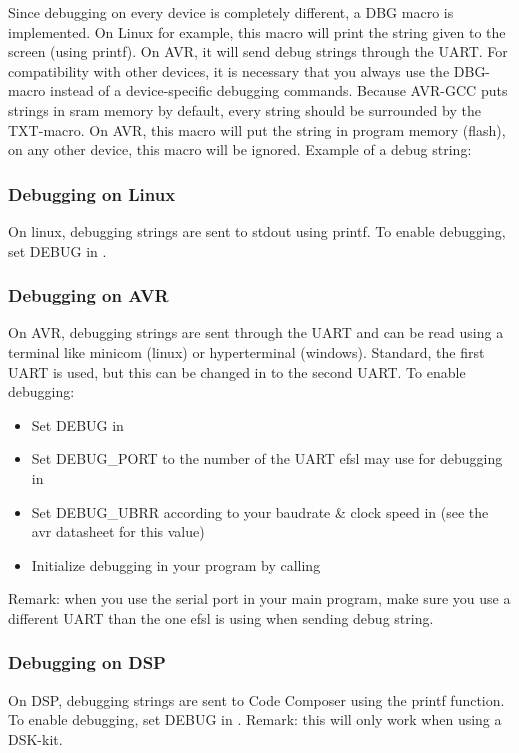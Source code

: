 Since debugging on every device is completely different, a DBG macro is 
implemented. On Linux for example, this macro will print the string given
to the screen (using printf). On AVR, it will send debug strings through the
UART. For compatibility with other devices, it is necessary that you always use
the DBG-macro instead of a device-specific debugging commands.\newline
\newline
Because AVR-GCC puts strings in sram memory by default, every string should be
surrounded by the TXT-macro. On AVR, this macro will put the string in program
memory (flash), on any other device, this macro will be ignored.\newline
\newline
Example of a debug string:\\ 

\subsubsection{Debugging on Linux}
On linux, debugging strings are sent to stdout using printf.\newline
\newline
To enable debugging, set DEBUG in .
\subsubsection{Debugging on AVR}
On AVR, debugging strings are sent through the UART and can be read using
a terminal like minicom (linux) or hyperterminal (windows). Standard, the
first UART is used, but this can be changed in  to the
second UART.\newline
\newline
To enable debugging:
\begin{itemize}
	\item{Set DEBUG in }
	\item{Set DEBUG\_PORT to the number of the UART efsl may use for debugging 
		in }
	\item{Set DEBUG\_UBRR according to your baudrate \& clock speed in 
		 (see the avr datasheet for this value)}
	\item{Initialize debugging in your program by calling }
\end{itemize}
Remark: when you use the serial port in your main program, make sure you
use a different UART than the one efsl is using when sending debug string.
\subsubsection{Debugging on DSP}
On DSP, debugging strings are sent to Code Composer using the printf function.
\newline\newline
To enable debugging, set DEBUG in .\newline
\newline
Remark: this will only work when using a DSK-kit.
